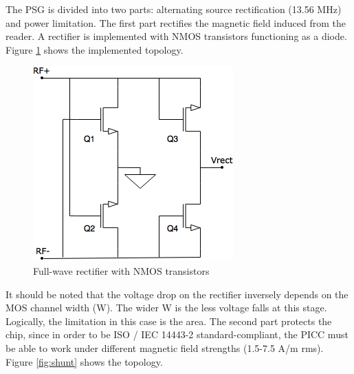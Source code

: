 \documentclass{article} %
\begin{document}
\begin{multicols}{2}
The PSG is divided into two parts: alternating source rectification (13.56 MHz) and power limitation. The first part rectifies the magnetic field induced from the reader. A rectifier is implemented with NMOS transistors functioning as a diode. Figure \ref{fig:rectifier} shows the implemented topology.

\begin{figure}[H]
\centering
\includegraphics[scale=0.6]{Images/ImagenesTesina/circuitos/Rectifier.png}
\caption{Full-wave rectifier with NMOS transistors}
\label{fig:rectifier}
\end{figure}

It should be noted that the voltage drop on the rectifier inversely depends on the MOS channel width (W). The wider W is the less voltage falls at this stage. Logically, the limitation in this case is the area. The second part protects the chip, since in order to be ISO / IEC 14443-2 standard-compliant, the PICC must be able to work under different magnetic field strengths (1.5-7.5 A/m rms). Figure  \ref{fig:shunt} shows the topology.


\end{multicols}
\end{document}
